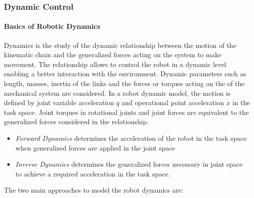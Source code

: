 \subsubsection{Dynamic Control}

\paragraph{Basics of Robotic Dynamics}
Dynamics is the study of the dynamic relationship between the motion of the kinematic chain and the generalized forces acting on the system to make movement. The relationship allows to control the robot in a dynamic level enabling a better interaction with the environment. Dynamic parameters such as length, masses, inertia of the links and the forces or torques acting on the 
of the mechanical system are considered. In a robot dynamic model, the motion is defined by joint variable acceleration $\ddot{q}$ and operational point acceleration $\ddot{x}$ in the task space. Joint torques in rotational joints and joint forces are equivalent to the generalized forces considered in the relationship.

\begin{itemize}
    \item \textit{Forward Dynamics} determines the acceleration of the robot in the task space when generalized forces are applied in the joint space
    \item \textit{Inverse Dynamics} determines the generalized forces necessary in joint space to achieve a required acceleration in the task space.
\end{itemize}

The two main approaches to model the robot dynamics are:

